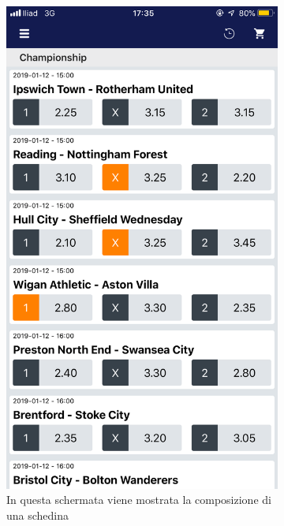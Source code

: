 \documentclass[numbers=noenddot, 12pt, a4paper, oneside]{scrbook}
\begin{document}
\begin{figure}[H]
	\begin{subfigure}{.5\textwidth}
		\centering
		\includegraphics[width=.8\linewidth]{images/Screen/ComposizioneSchedina}
		\caption{In questa schermata viene mostrata la composizione di una schedina}
	\end{subfigure}
	\begin{subfigure}{.5\textwidth}
		\centering

\end{subfigure}
\end{figure}
\end{document}
